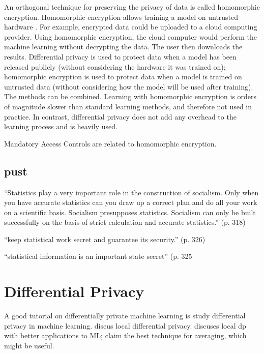 \documentclass{icopust}
\begin{document}
An orthogonal technique for preserving the privacy of data is called homomorphic encryption.
Homomorphic encryption allows training a model on untrusted hardware \cite{graepel2012ml}.
For example, encrypted data could be uploaded to a cloud computing provider.
Using homomorphic encryption, the cloud computer would perform the machine learning without decrypting the data.
The user then downloads the results.
Differential privacy is used to protect data when a model has been released publicly 
(without considering the hardware it was trained on);
homomorphic encryption is used to protect data when a model is trained on untrusted data 
(without considering how the model will be used after training).
The methods can be combined.
Learning with homomorphic encryption is orders of magnitude slower than standard learning methods,
and therefore not used in practice.
In contrast, differential privacy does not add any overhead to the learning process and is heavily used.

Mandatory Access Controls are related to homomorphic encryption.

\subsection{pust}

``Statistics play a very important role in the construction of socialism.
Only when you have accurate statistics can you draw up a correct plan and do all your work on a scientific basis.
Socialism presupposes statistics.
Socialism can only be built successfully on the basis of strict calculation and accurate statistics.'' (p. 318)


``keep statistical work secret and guarantee its security.'' (p. 326)

``statistical information is an important state secret'' (p. 325
\cite{kim1969statistical}


\section{Differential Privacy}

A good tutorial on differentially private machine learning is \cite{ji2016differential}
\cite{shokri2015privacy,abadi2016deep} study differential privacy in machine learning.
\cite{wainwright2012privacy} discus local differential privacy.
\cite{nguyen2016collecting} discuses local dp with better applications to ML; claim the best technique for averaging, which might be useful.
\end{document}

